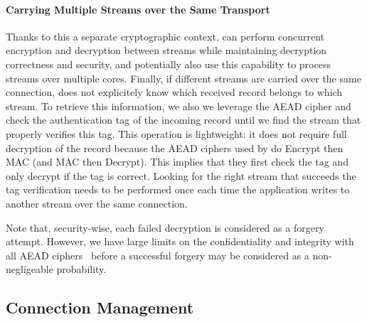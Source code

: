 \paragraph*{Carrying Multiple Streams over the Same Transport}
Thanks to this a separate cryptographic context, \tcpls can perform concurrent
encryption and decryption between streams while maintaining decryption
correctness and security, and potentially also use this capability to process
streams over multiple cores. Finally, if different streams are carried
over the same \tcp connection, \tcpls does not explicitely know which
received record belongs to which stream. To retrieve this information,
we also we
leverage the AEAD cipher and check the authentication tag of the
incoming record until we find the stream that properly verifies this tag. This
operation is lightweight: it does not require full decryption of the record
because the AEAD ciphers used by  do Encrypt then MAC (and MAC then
Decrypt). This implies that they first check the tag and only decrypt
if the tag is correct. Looking for the right stream that succeeds
the tag verification needs to be
performed once each time the application writes to another stream over the same
\tcp connection.

Note that, security-wise, each failed decryption is considered as a
forgery attempt. However, we have large limits on the confidentiality and
integrity with all AEAD ciphers~\cite{luykx2015limits, aeadlimits} before a
successful forgery may be considered as a non-negligeable probability.




\subsection{Connection Management}
\label{sec:multipath}

